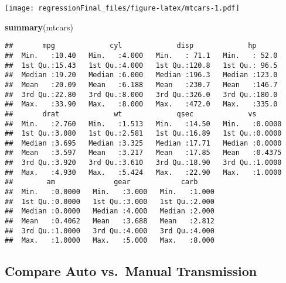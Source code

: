 \documentclass[]{article}
\newenvironment{Shaded}{\begin{snugshade}}{\end{snugshade}}
\newcommand{\KeywordTok}[1]{\textcolor[rgb]{0.13,0.29,0.53}{\textbf{#1}}}
\newcommand{\DecValTok}[1]{\textcolor[rgb]{0.00,0.00,0.81}{#1}}
\newcommand{\OperatorTok}[1]{\textcolor[rgb]{0.81,0.36,0.00}{\textbf{#1}}}
\newcommand{\NormalTok}[1]{#1}
\begin{document}
\texttt{[image: regressionFinal\_files/figure-latex/mtcars-1.pdf]}

\begin{Shaded}
\begin{Highlighting}[]
\KeywordTok{summary}\NormalTok{(mtcars)}
\end{Highlighting}
\end{Shaded}

\begin{verbatim}
##       mpg             cyl             disp             hp       
##  Min.   :10.40   Min.   :4.000   Min.   : 71.1   Min.   : 52.0  
##  1st Qu.:15.43   1st Qu.:4.000   1st Qu.:120.8   1st Qu.: 96.5  
##  Median :19.20   Median :6.000   Median :196.3   Median :123.0  
##  Mean   :20.09   Mean   :6.188   Mean   :230.7   Mean   :146.7  
##  3rd Qu.:22.80   3rd Qu.:8.000   3rd Qu.:326.0   3rd Qu.:180.0  
##  Max.   :33.90   Max.   :8.000   Max.   :472.0   Max.   :335.0  
##       drat             wt             qsec             vs        
##  Min.   :2.760   Min.   :1.513   Min.   :14.50   Min.   :0.0000  
##  1st Qu.:3.080   1st Qu.:2.581   1st Qu.:16.89   1st Qu.:0.0000  
##  Median :3.695   Median :3.325   Median :17.71   Median :0.0000  
##  Mean   :3.597   Mean   :3.217   Mean   :17.85   Mean   :0.4375  
##  3rd Qu.:3.920   3rd Qu.:3.610   3rd Qu.:18.90   3rd Qu.:1.0000  
##  Max.   :4.930   Max.   :5.424   Max.   :22.90   Max.   :1.0000  
##        am              gear            carb      
##  Min.   :0.0000   Min.   :3.000   Min.   :1.000  
##  1st Qu.:0.0000   1st Qu.:3.000   1st Qu.:2.000  
##  Median :0.0000   Median :4.000   Median :2.000  
##  Mean   :0.4062   Mean   :3.688   Mean   :2.812  
##  3rd Qu.:1.0000   3rd Qu.:4.000   3rd Qu.:4.000  
##  Max.   :1.0000   Max.   :5.000   Max.   :8.000
\end{verbatim}

\subsection{Compare Auto vs.~Manual
Transmission}\label{compare-auto-vs.manual-transmission}

\begin{Shaded}
\end{Shaded}
\end{document}
